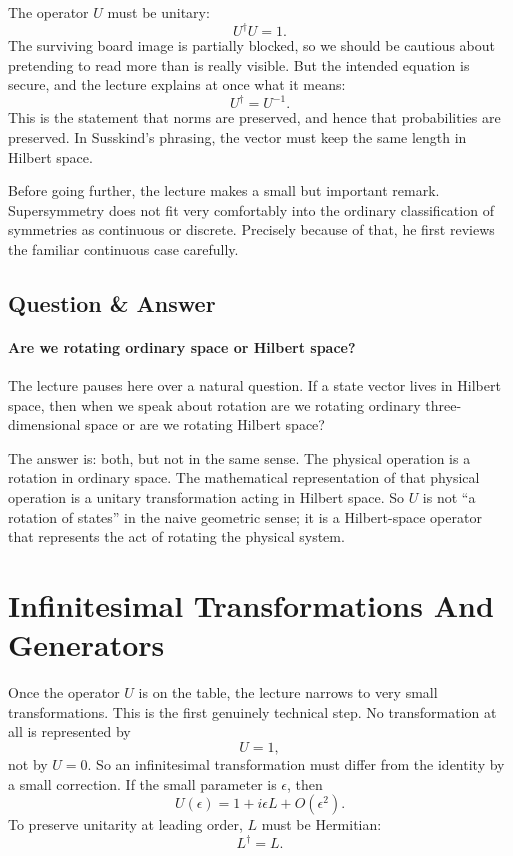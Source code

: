 The operator \(U\) must be unitary:
\begin{equation}
U^\dagger U = 1.
\end{equation}
The surviving board image is partially blocked, so we should be cautious about pretending to read more than is really visible. But the intended equation is secure, and the lecture explains at once what it means:
\begin{equation}
U^\dagger = U^{-1}.
\end{equation}
This is the statement that norms are preserved, and hence that probabilities are preserved. In Susskind's phrasing, the vector must keep the same length in Hilbert space.

Before going further, the lecture makes a small but important remark. Supersymmetry does not fit very comfortably into the ordinary classification of symmetries as continuous or discrete. Precisely because of that, he first reviews the familiar continuous case carefully.

\subsection{Question \& Answer}

\paragraph{Are we rotating ordinary space or Hilbert space?}

The lecture pauses here over a natural question. If a state vector lives in Hilbert space, then when we speak about rotation are we rotating ordinary three-dimensional space or are we rotating Hilbert space?

The answer is: both, but not in the same sense. The physical operation is a rotation in ordinary space. The mathematical representation of that physical operation is a unitary transformation acting in Hilbert space. So \(U\) is not ``a rotation of states'' in the naive geometric sense; it is a Hilbert-space operator that represents the act of rotating the physical system.

\section{Infinitesimal Transformations And Generators}

Once the operator \(U\) is on the table, the lecture narrows to very small transformations. This is the first genuinely technical step. No transformation at all is represented by
\begin{equation}
U=1,
\end{equation}
not by \(U=0\). So an infinitesimal transformation must differ from the identity by a small correction. If the small parameter is \(\epsilon\), then
\begin{equation}
U(\epsilon)=1+i\epsilon L+O(\epsilon^2).
\end{equation}
To preserve unitarity at leading order, \(L\) must be Hermitian:
\begin{equation}
L^\dagger = L.
\end{equation}

